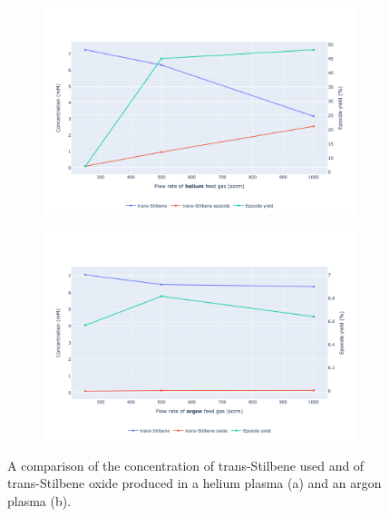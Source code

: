 \begin{figure}
    \centering
    \begin{subfigure}[b]{\textwidth}
        \centering
        \includegraphics[width=\textwidth]{chapter_6/figures/he_gas_concentration.png}
        \caption{}
        \label{fig:he_gas_concentration}
    \end{subfigure}
    \begin{subfigure}[b]{\textwidth}  
        \centering 
        \includegraphics[width=\textwidth]{chapter_6/figures/ar_gas_concentration.png}
        \caption{}
        \label{fig:ar_gas_concentration}
    \end{subfigure}
    \caption{\small A comparison of the concentration of trans-Stilbene used  and of trans-Stilbene oxide produced in a helium plasma (a) and an argon plasma (b).}
    \label{fig:ar_vs_he_test}
\end{figure}


